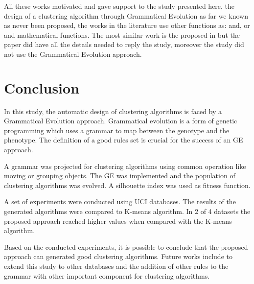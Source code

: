 \documentclass[journal]{IEEEtran}
\begin{document}
	All these works motivated and gave support to the study presented here, the design of a clustering algorithm through Grammatical Evolution as far we known as never been proposed, the works in the literature use other functions as:  and, or and mathematical functions. The most similar work is the proposed in \cite{bolton2015optimizing} but the paper did have all the details needed to reply the study, moreover the study did not use the Grammatical Evolution approach.

		
	\section{Conclusion}
	\label{sec:conclusion}
	
	In this study, the automatic design of clustering algorithms is faced by a Grammatical Evolution approach. Grammatical evolution is a form of genetic programming which uses a grammar to map between the genotype and the phenotype. The definition of a good rules set is crucial for the success of an GE approach. 

	A grammar was projected for clustering algorithms using common operation like moving or grouping objects. The GE was implemented and the population of clustering algorithms was evolved. A silhouette index was used as fitness function.


	A set of experiments were conducted using UCI databases. The results of the generated algorithms were compared to K-means algorithm. In 2 of 4 datasets the proposed approach reached higher values when compared with the K-means algorithm.

	Based on the conducted experiments, it is possible to conclude that the proposed approach can generated good clustering algorithms. Future works include to extend this study to other databases and the addition of other rules to the grammar with other important component for clustering algorithms.
	


	
	
	
\end{document}
